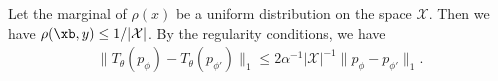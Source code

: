 Let the marginal of $\rho(x)$ be a uniform distribution on the space $\mathcal{X}$. Then we have $\rho(\xb,y) \le 1 / |\mathcal{X}|$. By the regularity conditions, we have
\begin{align*}
    \| T_\theta(p_\phi) - T_\theta(p_{\phi'}) \|_1 \le 2 \alpha^{-1} |\mathcal{X}|^{-1} \| p_{\phi} - p_{\phi'} \|_1 .
\end{align*}


